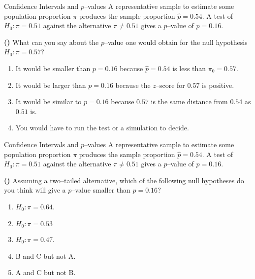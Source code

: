 \documentclass[13pt]{beamer}
\newcounter{count}
\newcommand{\question}{ \textbf{(\decimal{count})} \stepcounter{count}}
\begin{document}
\begin{frame}{Confidence Intervals and $p$--values}
A representative sample to estimate some population proportion $\pi$ produces the sample proportion $\hat{p}=0.54$. A test of $H_0:\pi=0.51$ against the alternative $\pi\neq 0.51$ gives a $p$--value of $p=0.16$.\smallskip

\question What can you say about the $p$--value one would obtain for the null hypothesis $H_0:\pi=0.57$?
\begin{enumerate}[A]
   \item It would be smaller than $p=0.16$ because $\hat{p}=0.54$ is less than $\pi_0=0.57$.
   \item It would be larger than $p=0.16$ because the $z$--score for $0.57$ is positive.
   \item It would be similar to $p=0.16$ because $0.57$ is the same distance from $0.54$ as $0.51$ is. %
   \item You would have to run the test or a simulation to decide.
\end{enumerate}
\end{frame}

\begin{frame}{Confidence Intervals and $p$--values}
A representative sample to estimate some population proportion $\pi$ produces the sample proportion $\hat{p}=0.54$. A test of $H_0:\pi=0.51$ against the alternative $\pi\neq 0.51$ gives a $p$--value of $p=0.16$.\smallskip

\question Assuming a two--tailed alternative, which of the following null hypotheses do you think will give a $p$--value smaller than $p=0.16$?
\begin{enumerate}[A]
   \item $H_0:\pi=0.64$.
   \item $H_0:\pi=0.53$
   \item $H_0:\pi=0.47$.
   \item B and C but not A.
   \item A and C but not B. %
\end{enumerate}
\end{frame}
\end{document}
